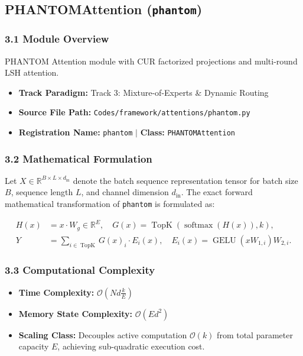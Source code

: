 \subsection{PHANTOMAttention (\texttt{phantom})}
\label{sec:app_module_phantom}

\subsubsection*{3.1 Module Overview}
PHANTOM Attention module with CUR factorized projections and multi-round LSH attention.
\begin{itemize}
    \item \textbf{Track Paradigm:} Track 3: Mixture-of-Experts \& Dynamic Routing
    \item \textbf{Source File Path:} \texttt{Codes/framework/attentions/phantom.py}
    \item \textbf{Registration Name:} \texttt{phantom} $\mid$ \textbf{Class:} \texttt{PHANTOMAttention}
\end{itemize}

\subsubsection*{3.2 Mathematical Formulation}
Let $X \in \mathbb{R}^{B \times L \times d_{\text{in}}}$ denote the batch sequence representation tensor for batch size $B$, sequence length $L$, and channel dimension $d_{\text{in}}$. The exact forward mathematical transformation of \texttt{phantom} is formulated as:

\begin{align}
H(x) &= x \cdot W_g \in \mathbb{R}^{E}, \quad G(x) = \operatorname{TopK}\left(\operatorname{softmax}(H(x)), k\right), \\
Y &= \sum_{i \in \operatorname{TopK}} G(x)_i \cdot E_i(x), \quad E_i(x) = \operatorname{GELU}(x W_{1, i}) W_{2, i}.
\end{align}


\subsubsection*{3.3 Computational Complexity}
\begin{itemize}
    \item \textbf{Time Complexity:} $\mathcal{O}(N d \frac{k}{E})$
    \item \textbf{Memory State Complexity:} $\mathcal{O}(E d^2)$
    \item \textbf{Scaling Class:} Decouples active computation $\mathcal{O}(k)$ from total parameter capacity $E$, achieving sub-quadratic execution cost.
\end{itemize}

